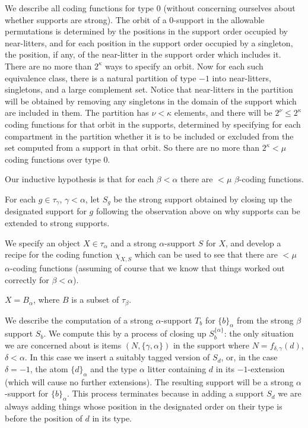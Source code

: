 \documentclass[112pt]{article}
\begin{document}
\begin{description}

\item[Analysis of coding functions for type 0:]  We describe all coding functions for type 0 (without concerning ourselves about whether supports are strong).  The orbit of a 0-support in the allowable permutations is determined by the positions in the support order occupied by near-litters, and for each position in the support order occupied by a singleton, the position, if any, of the near-litter in the support order which includes it.  There are no more than $2^\kappa$ ways to specify an orbit.  Now for each such equivalence class, there is a natural partition of type $-1$ into near-litters, singletons, and a large complement set.  Notice that near-litters in the partition will be obtained by removing any singletons in the domain of the support which are included in them.  The partition has $\nu<\kappa$ elements, and there will be $2^\nu\leq 2^\kappa$ coding functions for that orbit in the supports, determined by specifying for each compartment in the partition whether it is to be included or excluded from the set computed from a support in that orbit.  So there are no more than $2^\kappa<\mu$ coding functions over type 0.

\item[Analysis of the general case:]  

\item
Our inductive hypothesis is that for each $\beta<\alpha$ there are $<\mu$ $\beta$-coding functions.

For each $g \in \tau_\gamma$, $\gamma<\alpha$, let $S_g$ be the strong support obtained by closing up the designated support for $g$ following the observation above on why supports can be extended to strong supports.

We specify an object $X\in \tau_\alpha$ and a strong $\alpha$-support $S$ for $X$, and develop a recipe for the coding function $\chi_{X,S}$ which can be used to see that there are $<\mu$ $\alpha$-coding functions (assuming of course that we know that things worked out correctly for $\beta<\alpha$).

$X = B_\alpha$, where $B$ is a subset of $\tau_\beta$.  

We describe the computation of a strong $\alpha$-support $T_b$
for $\{b\}_\alpha$ from the strong $\beta$ support $S_b$.   We compute this by a process of closing up $S_b^{\{\alpha\}}$:  the only situation we are concerned
about is items $(N,\{\gamma,\alpha\})$ in the support where $N=f_{\delta,\gamma}(d)$, $\delta<\alpha$.  In this case we insert a suitably
tagged version of $S_d$, or, in the case $\delta= -1$, the atom $\{d\}_\alpha$ and the type $\alpha$ litter containing $d$ in its $-1$-extension (which will cause no further extensions).   The resulting support will be a strong $\alpha$-support for $\{b\}_\alpha$.  This process terminates because in adding a support $S_d$ we are always adding things whose position in the designated order on their type is before the position of $d$ in its type.


\end{description}
\end{document}
